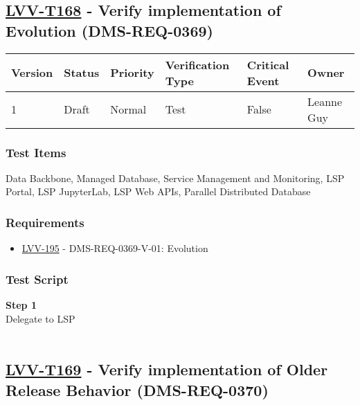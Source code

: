\hypertarget{lvv-t168---verify-implementation-of-evolution-dms-req-0369}{%
\subsection{\texorpdfstring{\href{https://jira.lsstcorp.org/secure/Tests.jspa\#/testCase/LVV-T168}{LVV-T168}
- Verify implementation of Evolution
(DMS-REQ-0369)}{LVV-T168 - Verify implementation of Evolution (DMS-REQ-0369)}}\label{lvv-t168---verify-implementation-of-evolution-dms-req-0369}}

\begin{longtable}[]{@{}llllll@{}}
\toprule
Version & Status & Priority & Verification Type & Critical Event &
Owner\tabularnewline
\midrule
\endhead
1 & Draft & Normal & Test & False & Leanne Guy\tabularnewline
\bottomrule
\end{longtable}

\hypertarget{test-items-144}{%
\subsubsection{Test Items}\label{test-items-144}}

Data Backbone, Managed Database, Service Management and Monitoring, LSP
Portal, LSP JupyterLab, LSP Web APIs, Parallel Distributed Database~

\hypertarget{requirements-145}{%
\subsubsection{Requirements}\label{requirements-145}}

\begin{itemize}
\tightlist
\item
  \href{https://jira.lsstcorp.org/browse/LVV-195}{LVV-195} -
  DMS-REQ-0369-V-01: Evolution
\end{itemize}

\hypertarget{test-script-145}{%
\subsubsection{Test Script}\label{test-script-145}}

\textbf{Step 1}\\
Delegate to LSP\\
~\\

\hypertarget{lvv-t169---verify-implementation-of-older-release-behavior-dms-req-0370}{%
\subsection{\texorpdfstring{\href{https://jira.lsstcorp.org/secure/Tests.jspa\#/testCase/LVV-T169}{LVV-T169}
- Verify implementation of Older Release Behavior
(DMS-REQ-0370)}{LVV-T169 - Verify implementation of Older Release Behavior (DMS-REQ-0370)}}\label{lvv-t169---verify-implementation-of-older-release-behavior-dms-req-0370}}

